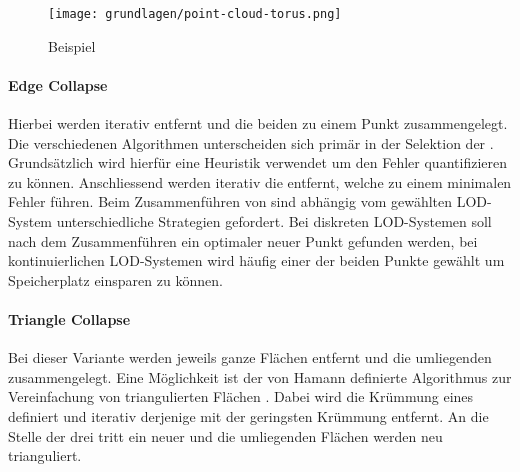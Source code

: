 \begin{figure}[H]
  \centering
  \texttt{[image: grundlagen/point-cloud-torus.png]}
  \caption{Beispiel  \cite{pointCloudTorus}}
  \label{fig:pointCloudTorus}
\end{figure}

\paragraph{Edge Collapse}
Hierbei werden iterativ  entfernt und die beiden  zu einem Punkt zusammengelegt.
Die verschiedenen Algorithmen unterscheiden sich primär in der Selektion der . Grundsätzlich wird hierfür eine Heuristik verwendet um den Fehler quantifizieren zu können. Anschliessend werden iterativ die  entfernt, welche zu einem minimalen Fehler führen. Beim Zusammenführen von  sind abhängig vom gewählten LOD-System unterschiedliche Strategien gefordert. Bei diskreten LOD-Systemen soll nach dem Zusammenführen ein optimaler neuer Punkt gefunden werden, bei kontinuierlichen LOD-Systemen wird häufig einer der beiden Punkte gewählt um Speicherplatz einsparen zu können.

\paragraph{Triangle Collapse}
Bei dieser Variante werden jeweils ganze Flächen entfernt und die umliegenden  zusammengelegt. Eine Möglichkeit ist der von Hamann definierte Algorithmus zur Vereinfachung von triangulierten Flächen \cite{triangleCollapseAlgorithm}. Dabei wird die Krümmung eines  definiert und iterativ derjenige  mit der geringsten Krümmung entfernt. An die Stelle der drei  tritt ein neuer  und die umliegenden Flächen werden neu trianguliert.
